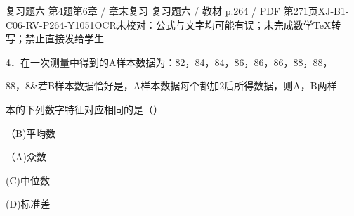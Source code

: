 \begin{bankitem}{复习题六 第4题}{第6章 / 章末复习 复习题六 / 教材 p.264 / PDF 第271页}{XJ-B1-C06-RV-P264-Y1051}{OCR未校对：公式与文字均可能有误；未完成数学TeX转写；禁止直接发给学生}
\begin{ocrdraft}
\par
4．在一次测量中得到的A样本数据为：82，84，84，86，86，86，88，88，
\par
88，8\&若B样本数据恰好是，A样本数据每个都加2后所得数据，则A，B两样
\par
本的下列数字特征对应相同的是（）
\par
（B)平均数
\par
（A)众数
\par
(C)中位数
\par
(D)标准差
\end{ocrdraft}
\end{bankitem}
